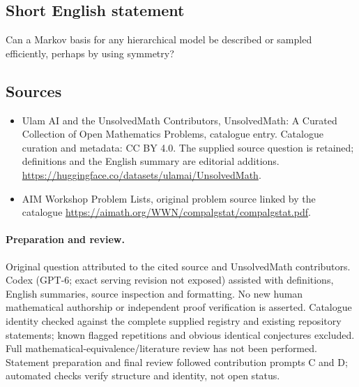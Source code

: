 \documentclass[11pt]{article}
\begin{document}
\subsection{Short English statement}
Can a Markov basis for any hierarchical model be described or sampled efficiently, perhaps by using symmetry?
\subsection{Sources}
\begin{itemize}
\item[\hypertarget{source:statement:1}{S1}] Ulam AI and the UnsolvedMath Contributors, UnsolvedMath: A Curated Collection of Open Mathematics Problems, catalogue entry. Catalogue curation and metadata: CC BY 4.0. The supplied source question is retained; definitions and the English summary are editorial additions.
\url{https://huggingface.co/datasets/ulamai/UnsolvedMath}.
\item[\hypertarget{source:statement:2}{S2}] AIM Workshop Problem Lists, original problem source linked by the catalogue
\url{https://aimath.org/WWN/compalgstat/compalgstat.pdf}.
\end{itemize}
\paragraph{Preparation and review.}
Original question attributed to the cited source and UnsolvedMath contributors. Codex (GPT-6; exact serving revision not exposed) assisted with definitions, English summaries, source inspection and formatting. No new human mathematical authorship or independent proof verification is asserted. Catalogue identity checked against the complete supplied registry and existing repository statements; known flagged repetitions and obvious identical conjectures excluded. Full mathematical-equivalence/literature review has not been performed. Statement preparation and final review followed contribution prompts C and D; automated checks verify structure and identity, not open status.
\label{end:statement}
\end{document}
